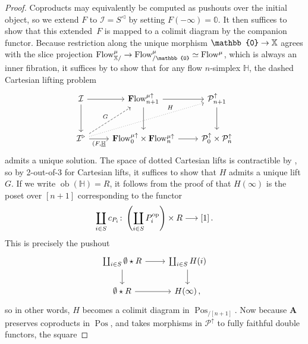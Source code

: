 \documentclass[10pt]{amsart}
\numberwithin{equation}{section}
\theoremstyle{definition}
\DeclareMathOperator{\ob}{ob}
\DeclareMathOperator{\op}{op}
\DeclareMathOperator{\Pos}{Pos}
\newcommand{\PreFlow}{\mathrm{Flow}\vphantom{w}}
\newcommand{\bfPreFlow}{\mathbf{F}\mathrm{low}\vphantom{w}}
\newcommand{\bH}{\mathbb{H}}
\newcommand{\bX}{\mathbb{X}}
\newcommand{\bZero}{\mathbb{0}}
\newcommand{\cI}{\mathcal{I}}
\newcommand{\cP}{\mathcal{P}}
\newcommand{\bfA}{\mathbf{A}}
\newcommand{\join}{\star}
\renewcommand{\to}{\mathchoice{\longrightarrow}{\rightarrow}{}{}}
\begin{document}
\begin{proof}
	Coproducts may equivalently be computed as pushouts over the initial object, so we extend $F$ to $\cI = S^{\triangleleft}$ by setting $F(-\infty) = \bZero$.
  It then suffices to show that this extended~$F$ is mapped to a colimit diagram by the companion functor.
  Because restriction along the unique morphism $\bZero \to \bX$ agrees with the slice projection $\PreFlow^{\mu}_{\bX/} \to \PreFlow^{\mu}_{/\bZero } \simeq \PreFlow^{\mu}$, which is always an inner fibration, it suffices by  to show that for any flow $n$-simplex $\bH$, the dashed Cartesian lifting problem
	\begin{equation*}
		\begin{tikzcd}[row sep=large]
			\cI \arrow[r]
			\arrow[d]    &
			\bfPreFlow^{\mu\uparrow}_{n+1}
			\arrow[d]
			\arrow[r]   &
			\cP^{\uparrow}_{n+1}
			\arrow[d] \\
			\cI^{\triangleright}
			\arrow[r, "{(F, \underline{\bH}}"']         \arrow[ur, "G",dashed]
			\arrow[urr, "H"{near end}, ,dotted]    &
			\bfPreFlow^{\mu\uparrow}_{0} \times \bfPreFlow^{\mu\uparrow}_{n}
			\arrow[r]    &
			\cP^{\uparrow}_{0} \times \cP^{\uparrow}_{n}
		\end{tikzcd}
	\end{equation*}
	admits a unique solution.
  The space of dotted Cartesian lifts is contractible by , so by 2-out-of-3 for Cartesian lifts, it suffices to show that $H$ admits a unique lift $G$.
  If we write $\ob(\bH)=R$, it follows from the proof of  that $H(\infty)$ is the poset over $[n+1]$ corresponding to the functor
	\begin{align*}
		\coprod_{i\in S} c_{P_{i}}\colon \left(\coprod_{i\in S} P_{i}^{\op} \right) \times R \to [1] \,.
	\end{align*}
	This is precisely the pushout
	\begin{equation*}
		\begin{tikzcd}
			\coprod_{i\in S} \emptyset \join R \arrow[r] \arrow[d]      &   \coprod_{i\in S} H(i)  \arrow[d] \\
			\emptyset \join R  \arrow[r]               &   H(\infty) \,,
		\end{tikzcd}
	\end{equation*}
	so in other words, $H$ becomes a colimit diagram in $\Pos_{/[n+1]}$.
  Now because $\bfA$ preserves coproducts in $\Pos$, and takes morphisms in $\cP^{\uparrow}$ to fully faithful double functors, the square

\end{proof}
\end{document}
